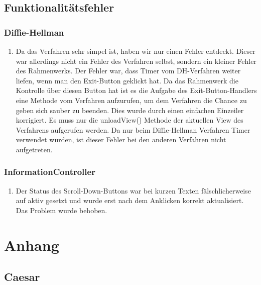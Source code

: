 \documentclass{article}
\begin{document}
     \subsection{Funktionalitätsfehler}
     \subsubsection{Diffie-Hellman}
     \begin{enumerate}
         \item Da das Verfahren sehr simpel ist, haben wir nur einen Fehler entdeckt.
             Dieser war allerdings nicht ein Fehler des Verfahren selbst, sondern
             ein kleiner Fehler des Rahmenwerks. Der Fehler war, dass Timer vom DH-Verfahren weiter liefen,
             wenn man den Exit-Button geklickt hat. Da das Rahmenwerk die Kontrolle über diesen Button
             hat ist es die Aufgabe des Exit-Button-Handlers eine Methode vom Verfahren aufzurufen,
             um dem Verfahren die Chance zu geben sich sauber zu beenden. Dies wurde
             durch einen einfachen Einzeiler korrigiert. Es muss nur die unloadView() Methode der aktuellen
             View des Verfahrens aufgerufen werden.
             Da nur beim Diffie-Hellman Verfahren Timer verwendet wurden, ist dieser
             Fehler bei den anderen Verfahren nicht aufgetreten.
         \end{enumerate}

    \subsubsection{InformationController}
     \begin{enumerate}
         \item Der Status des Scroll-Down-Buttons war bei kurzen Texten fälschlicherweise auf aktiv gesetzt
         und wurde erst nach dem Anklicken korrekt aktualisiert. Das Problem wurde behoben.
         \end{enumerate}
\clearpage

\section{Anhang}

 \subsection{Caesar}
\end{document}
